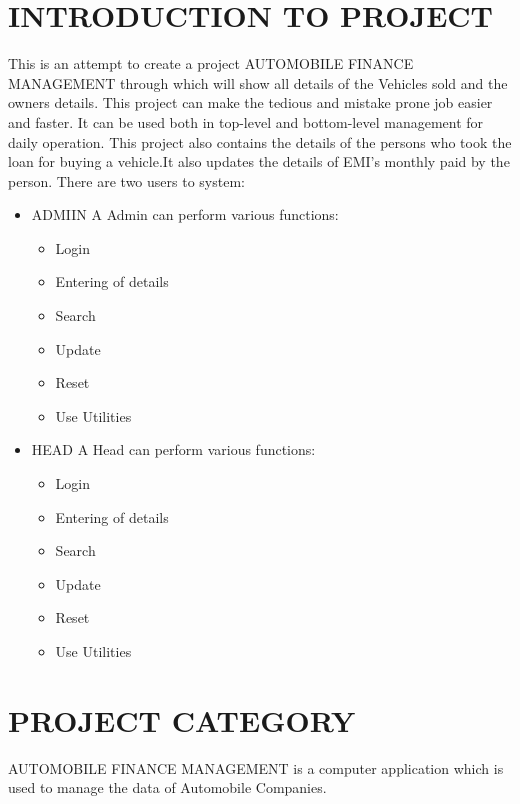 \section{INTRODUCTION TO PROJECT}

This is an attempt to create a project AUTOMOBILE FINANCE MANAGEMENT through which will show
all details of the Vehicles sold and the owners details. This project can make the tedious and mistake prone
job easier and faster. It can be used both in top-level and bottom-level management for daily
operation.\newline
This project also contains the details of the persons who took the loan for buying a vehicle.It also updates the details of EMI's monthly paid by the person.\newline
There are two users to system:
\newline
\begin{itemize}
\item ADMIIN\newline
A Admin can perform various functions:
\begin{itemize}
\item Login
\item Entering of details
\item Search
\item Update
\item Reset
\item Use Utilities
\end{itemize}
\item HEAD\newline
A Head can perform various functions:
\begin{itemize}
\item Login
\item Entering of details
\item Search
\item Update
\item Reset
\item Use Utilities
\end{itemize}
\end{itemize}

\section{PROJECT CATEGORY}
AUTOMOBILE FINANCE MANAGEMENT is a computer application which is used to manage the data of Automobile Companies.

